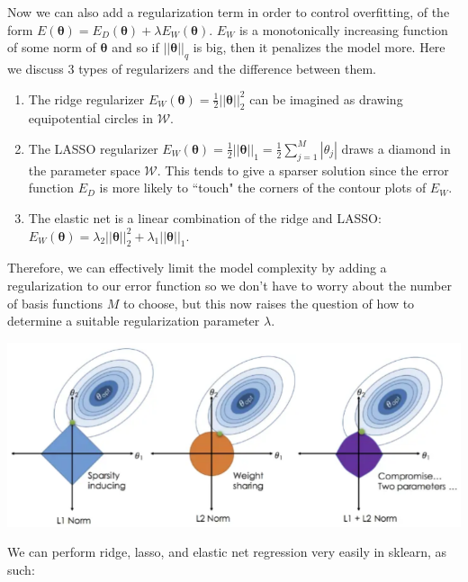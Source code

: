 \documentclass{article}
\begin{document}
    Now we can also add a regularization term in order to control overfitting, of the form $E(\boldsymbol{\theta}) = E_D (\boldsymbol{\theta}) + \lambda E_W (\boldsymbol{\theta})$. $E_W$ is a monotonically increasing function of some norm of $\boldsymbol{\theta}$ and so if $||\boldsymbol{\theta}||_q$ is big, then it penalizes the model more. Here we discuss 3 types of regularizers and the difference between them. 

    \begin{enumerate}
      \item The ridge regularizer $E_W (\boldsymbol{\theta}) = \frac{1}{2} ||\boldsymbol{\theta}||_2^2$ can be imagined as drawing equipotential circles in $\mathcal{W}$. 

      \item The LASSO regularizer $E_W (\boldsymbol{\theta}) = \frac{1}{2} ||\boldsymbol{\theta}||_1 = \frac{1}{2} \sum_{j=1}^M |\theta_j|$ draws a diamond in the parameter space $\mathcal{W}$. This tends to give a sparser solution since the error function $E_D$ is more likely to ``touch" the corners of the contour plots of $E_W$. 

      \item The elastic net is a linear combination of the ridge and LASSO: $E_W (\boldsymbol{\theta}) = \lambda_2 ||\boldsymbol{\theta}||_2^2 + \lambda_1 ||\boldsymbol{\theta}||_1$. 
    \end{enumerate}

    Therefore, we can effectively limit the model complexity by adding a regularization to our error function so we don't have to worry about the number of basis functions $M$ to choose, but this now raises the question of how to determine a suitable regularization parameter $\lambda$. 

    \begin{center}
      \includegraphics[scale=0.5]{img/regularizers.png}
    \end{center}

    We can perform ridge, lasso, and elastic net regression very easily in sklearn, as such: 
\end{document}
